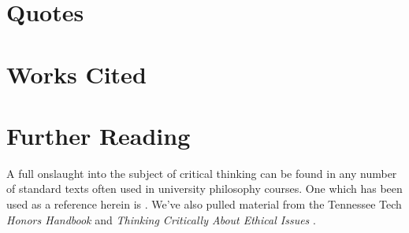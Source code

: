 \section{Quotes}

\section{Works Cited}


\section{Further Reading}

A full onslaught into the subject of critical thinking can be found in any number of standard texts often used in university philosophy courses. One which has been used as a reference herein is \cite{MoPa:01}. We've also pulled material from the Tennessee Tech \emph{Honors Handbook} \cite{Hon:06} and \emph{Thinking Critically About Ethical Issues} \cite{Ru:04}.

